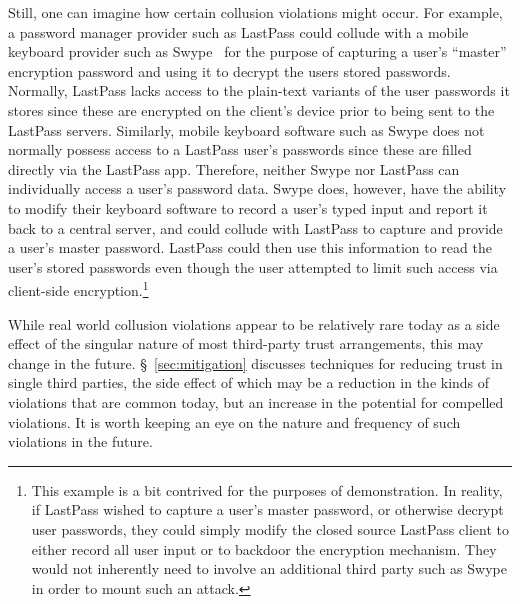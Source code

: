 Still, one can imagine how certain collusion violations might
occur. For example, a password manager provider such as LastPass could
collude with a mobile keyboard provider such as Swype~\cite{swype} for
the purpose of capturing a user's ``master'' encryption password and
using it to decrypt the users stored passwords. Normally, LastPass
lacks access to the plain-text variants of the user passwords it
stores since these are encrypted on the client's device prior to being
sent to the LastPass servers. Similarly, mobile keyboard software such
as Swype does not normally possess access to a LastPass user's
passwords since these are filled directly via the LastPass
app. Therefore, neither Swype nor LastPass can individually access a
user's password data. Swype does, however, have the ability to modify
their keyboard software to record a user's typed input and report it
back to a central server, and could collude with LastPass to capture
and provide a user's master password. LastPass could then use this
information to read the user's stored passwords even though the user
attempted to limit such access via client-side
encryption.\footnote{This example is a bit contrived for the purposes
  of demonstration. In reality, if LastPass wished to capture a user's
  master password, or otherwise decrypt user passwords, they could
  simply modify the closed source LastPass client to either record all
  user input or to backdoor the encryption mechanism. They would not
  inherently need to involve an additional third party such as Swype
  in order to mount such an attack.}

While real world collusion violations appear to be relatively rare
today as a side effect of the singular nature of most third-party
trust arrangements, this may change in the
future. \S~\ref{sec:mitigation} discusses techniques for reducing
trust in single third parties, the side effect of which may be a
reduction in the kinds of violations that are common today, but an
increase in the potential for compelled violations. It is worth
keeping an eye on the nature and frequency of such violations in the
future.

